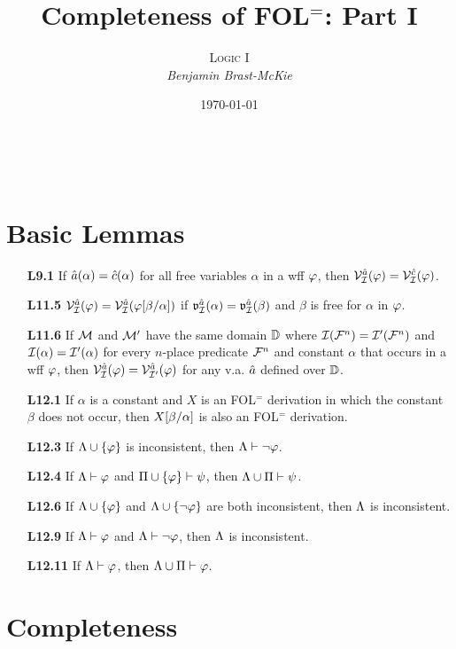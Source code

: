 \documentclass[a4paper, 11pt]{article} %
\title{\textbf{Completeness of FOL$^=$: Part I}} %
\author{\textsc{Logic I}\\ \em Benjamin Brast-McKie} %
\date{\today} %
\makeatletter
\renewcommand{\maketitle}{
\begin{flushright}
{\LARGE\@title}

\vspace{10pt}

{\@author}
\\ \@date
\end{flushright}

\vspace{60pt}

}
\makeatother
\begin{document}
\maketitle %

\thispagestyle{empty}



\section*{Basic Lemmas}

\begin{itemize}
  \item[\bf L9.1] If $\hat{a}(\alpha)=\hat{c}(\alpha)$ for all free variables $\alpha$ in a wff $\varphi$, then $\mathcal{V}_{\mathcal{I}}^{\hat{a}}(\varphi)=\mathcal{V}_{\mathcal{I}}^{\hat{c}}(\varphi)$.
  \item[\bf L11.5] $\mathcal{V}_{\mathcal{I}}^{\hat{a}}(\varphi)=\mathcal{V}_{\mathcal{I}}^{\hat{a}}(\varphi[\beta/\alpha])$ if $\mathfrak{v}_{\mathcal{I}}^{\hat{a}}(\alpha)=\mathfrak{v}_{\mathcal{I}}^{\hat{a}}(\beta)$ and $\beta$ is free for $\alpha$ in $\varphi$.
  \item[\bf L11.6] If $\mathcal{M}$ and $\mathcal{M}'$ have the same domain $\mathbb{D}$ where $\mathcal{I}(\mathcal{F}^n)=\mathcal{I}'(\mathcal{F}^n)$ and $\mathcal{I}(\alpha)=\mathcal{I}'(\alpha)$ for every $n$-place predicate $\mathcal{F}^n$ and constant $\alpha$ that occurs in a wff $\varphi$, then $\mathcal{V}_{\mathcal{I}}^{\hat{a}}(\varphi)=\mathcal{V}_{\mathcal{I}'}^{\hat{a}}(\varphi)$ for any v.a. $\hat{a}$ defined over $\mathbb{D}$.
  \item[\bf L12.1] If $\alpha$ is a constant and $X$ is an FOL$^=$ derivation in which the constant $\beta$ does not occur, then $X[\beta/\alpha]$ is also an FOL$^=$ derivation.
  \item[\bf L12.3] If $\Lambda\cup\lbrace\varphi\rbrace$ is inconsistent, then $\Lambda\vdash\neg\varphi$.
  \item[\bf L12.4] If $\Lambda \vdash \varphi$ and $\Pi\cup\lbrace\varphi\rbrace \vdash \psi$, then $\Lambda\cup\Pi \vdash \psi$.
  \item[\bf L12.6] If $\Lambda \cup \lbrace\varphi\rbrace$ and $\Lambda\cup \lbrace\neg\varphi\rbrace$ are both inconsistent, then $\Lambda$ is inconsistent.
  \item[\bf L12.9] If $\Lambda\vdash\varphi$ and $\Lambda\vdash\neg\varphi$, then $\Lambda$ is inconsistent.
  \item[\bf L12.11] If $\Lambda\vdash\varphi$, then $\Lambda\cup\Pi\vdash\varphi$.
\end{itemize}


\section*{Completeness}
\end{document}
